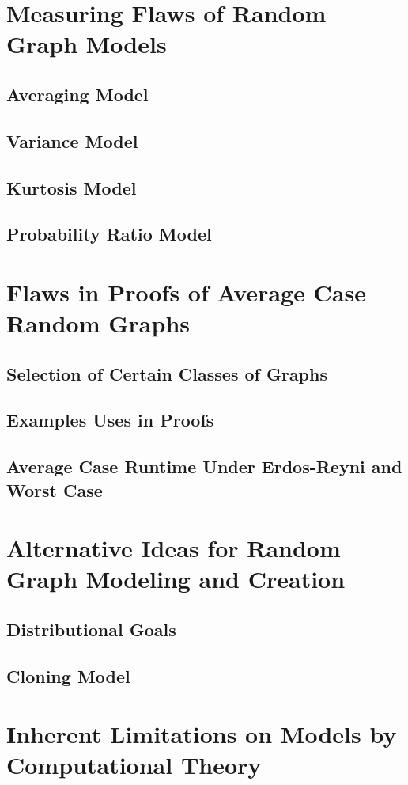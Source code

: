 \documentclass[11pt,a4paper]{report}
\begin{document}
\section{Measuring Flaws of Random Graph Models}
\subsection{Averaging Model}
\subsection{Variance Model}
\subsection{Kurtosis Model}
\subsection{Probability Ratio Model}

\section{Flaws in Proofs of Average Case Random Graphs}
\subsection{Selection of Certain Classes of Graphs}
\subsection{Examples Uses in Proofs}
\subsection{Average Case Runtime Under Erdos-Reyni and Worst Case}

\section{Alternative Ideas for Random Graph Modeling and Creation}
\subsection{Distributional Goals}
\subsection{Cloning Model}

\section{Inherent Limitations on Models by Computational Theory}
\end{document}
